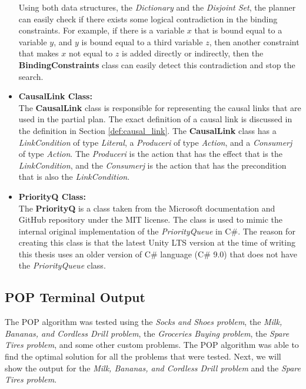 \begin{itemize}
          Using both data structures, the \textit{Dictionary} and the \textit{Disjoint Set}, the planner can easily check if there exists some logical contradiction in the binding constraints. For example, if there is a variable $x$ that is bound equal to a variable $y$, and $y$ is bound equal to a third variable $z$, then another constraint that makes $x$ not equal to $z$ is added directly or indirectly, then the \textbf{BindingConstraints} class can easily detect this contradiction and stop the search.

    \item \textbf{CausalLink Class:} \\
          The \textbf{CausalLink} class is responsible for representing the causal links that are used in the partial plan. The exact definition of a causal link is discussed in the definition in Section \ref{def:causal_link}. The \textbf{CausalLink} class has a \textit{LinkCondition} of type \textit{Literal}, a \textit{Produceri} of type \textit{Action}, and a \textit{Consumerj} of type \textit{Action}.
          The \textit{Produceri} is the action that has the effect that is the \textit{LinkCondition}, and the \textit{Consumerj} is the action that has the precondition that is also the \textit{LinkCondition}.

    \item \textbf{PriorityQ Class:} \\
          The \textbf{PriorityQ} is a class taken from the Microsoft documentation and GitHub repository under the MIT license\cite{MicrosoftPQ}\cite{GitHubPQ}. The class is used to mimic the internal original implementation of the \textit{PriorityQueue} in C\#. The reason for creating this class is that the latest Unity \ac{LTS} version at the time of writing this thesis uses an older version of C\# language (C\# 9.0) that does not have the \textit{PriorityQueue} class.

\end{itemize}


\subsection{POP Terminal Output} \label{subsec:pop_output}

The \ac{POP} algorithm was tested using the \textit{Socks and Shoes problem}, the \textit{Milk, Bananas, and Cordless Drill problem}, the \textit{Groceries Buying problem}, the \textit{Spare Tires problem}, and some other custom problems. The \ac{POP} algorithm was able to find the optimal solution for all the problems that were tested. Next, we will show the output for the \textit{Milk, Bananas, and Cordless Drill problem} and the \textit{Spare Tires problem}.

